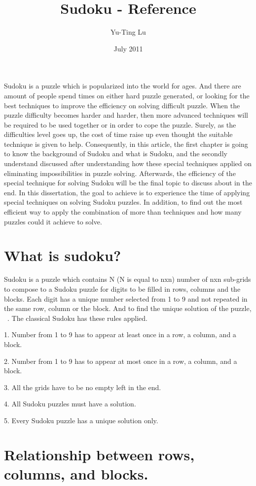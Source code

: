 \documentclass[11pt]{report}
\begin{document}
\title{Sudoku - Reference}
\author{Yu-Ting Lu}
\date{July 2011}
\maketitle

\tableofcontents

Sudoku is a puzzle which is popularized into the world for ages. And there are amount of people spend times on either hard puzzle generated, or looking for the best techniques to improve the efficiency on solving difficult puzzle.
When the puzzle difficulty becomes harder and harder, then more advanced techniques will be required to be used together or in order to cope the puzzle. Surely, as the difficulties level goes up, the cost of time raise up even thought the suitable technique is given to help. Consequently, in this article, the first chapter is going to know the background of Sudoku and what is Sudoku, and the secondly understand discussed after understanding how these special techniques applied on eliminating impossibilities in puzzle solving. Afterwards, the efficiency of the special technique for solving Sudoku will be the final topic to discuss about in the end.
In this dissertation, the goal to achieve is to experience the time of applying special techniques on solving Sudoku puzzles. In addition, to find out the most efficient way to apply the combination of more than techniques and how many puzzles could it achieve to solve.
\section{What is sudoku?}
Sudoku is a puzzle which contains N (N is equal to nxn) number of nxn sub-grids to compose to a Sudoku puzzle for digits to be filled in rows, columns and the blocks. Each digit has a unique number selected from 1 to 9 and not repeated in the same row, column or the block.
And to find the unique solution of the puzzle,  ~\cite{Berthier2007Sudoku}.
The classical Sudoku has these rules applied.

1. Number from 1 to 9 has to appear at least once in a row, a column, and a block.

2. Number from 1 to 9 has to appear at most once in a row, a column, and a block.

3. All the grids have to be no empty left in the end.

4. All Sudoku puzzles must have a solution.

5. Every Sudoku puzzle has a unique solution only.
\section
{Relationship between rows, columns, and blocks.}
\newpage
{}

\end{document}
